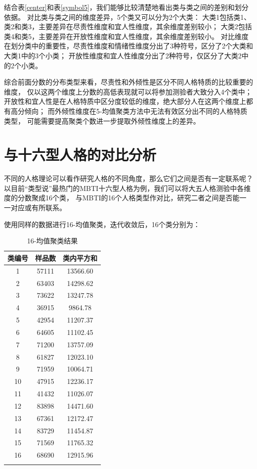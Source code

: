 \documentclass[UTF8]{ctexart}
\begin{document}
结合表\ref{center}和表\ref{symbol5}，我们能够比较清楚地看出类与类之间的差别和划分依据。
对比类与类之间的维度差异，5个类又可以分为2个大类：
大类1包括类1、类2和类3，主要差异在尽责性维度和宜人性维度，其余维度差别较小；
大类2包括类4和类5，主要差异在开放性维度和宜人性维度，其余维度差别较小。
对比维度在划分类中的重要性，尽责性维度和情绪性维度分出了3种符号，区分了2个大类和大类1中的3个小类；
开放性维度和宜人性维度分出了2种符号，仅区分了大类2中的2个小类。\par
综合前面分数的分布类型来看，尽责性和外倾性是区分不同人格特质的比较重要的维度，
仅以这两个维度上分数的高低表现就可以将参加测验者大致分入4个类中；
开放性和宜人性是在人格特质中区分度较低的维度，绝大部分人在这两个维度上都有高分倾向；
而外倾性维度在5-均值聚类方法中无法有效区分出不同的人格特质类型，
可能需要提高聚类个数进一步提取外倾性维度上的差异。
\section{与十六型人格的对比分析}
不同的人格理论可以看作研究人格的不同角度，那么它们之间是否有一定联系呢？
以目前“类型说”最热门的MBTI十六型人格为例，我们可以将大五人格测验中各维度的分数聚成16个类，
与MBTI的16个人格类型作对比，研究二者之间是否能一一对应或有所联系。\par
使用同样的数据进行16-均值聚类，迭代收敛后，16个类分别为：
\begin{longtable}{c|c|c}
  \hline
  类编号 & 样品数   & 类内平方和    \\\hline
  1   & 57111 & 13566.60 \\\hline
  2   & 63403 & 14298.62 \\\hline
  3   & 73622 & 13247.78 \\\hline
  4   & 36915 & 9864.78  \\\hline
  5   & 42954 & 11207.37 \\\hline
  6   & 64605 & 11102.45 \\\hline
  7   & 71200 & 13757.09 \\\hline
  8   & 61827 & 12023.10 \\\hline
  9   & 71959 & 10064.71 \\\hline
  10  & 47915 & 12236.17 \\\hline
  11  & 41432 & 11026.07 \\\hline
  12  & 83898 & 14471.60 \\\hline
  13  & 67361 & 12172.47 \\\hline
  14  & 83729 & 11454.87 \\\hline
  15  & 71569 & 11765.32 \\\hline
  16  & 68690 & 12915.96 \\\hline
  \caption{16-均值聚类结果}
\end{longtable}
\end{document}
